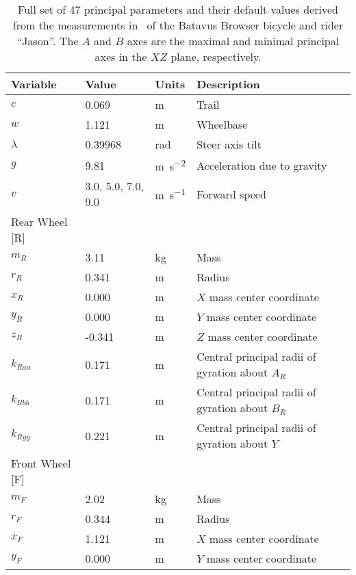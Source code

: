 \documentclass{bmd2019p}
\begin{document}
\begin{table}
  \caption{Full set of 47 principal parameters and their default values derived
    from the measurements in~\cite{Moore2012} of the Batavus Browser bicycle
    and rider ``Jason''. The $A$ and $B$ axes are the maximal and minimal
    principal axes in the $XZ$ plane, respectively.}
  \label{tab:parameters}
  \small
  \centering
  \begin{tabular}{llll}
    \toprule
    Variable & Value & Units & Description \\
    \midrule
    $c$       &  0.069           & \si{\meter} & Trail \\
    $w$       &  1.121             & \si{\meter} & Wheelbase \\
    $\lambda$ & 0.39968             & \si{\radian} & Steer axis tilt \\
    $g$       &  9.81               & \si{\meter\per\second\squared} & Acceleration due to gravity \\
    $v$       &  3.0, 5.0, 7.0, 9.0 & \si{\meter\per\second} & Forward speed \\
    Rear Wheel [R] & & \\
    \midrule
    $m_R$     & 3.11 & \si{\kilogram}  & Mass \\
    $r_R$     & 0.341 & \si{\meter}  & Radius \\
    $x_R$     & 0.000 & \si{\meter}      & $X$ mass center coordinate \\
    $y_R$     & 0.000 & \si{\meter}      & $Y$ mass center coordinate \\
    $z_R$     & -0.341 & \si{\meter} & $Z$ mass center coordinate \\
    $k_{Raa}$ & 0.171 & \si{\meter}  & Central principal radii of gyration about $A_R$ \\
    $k_{Rbb}$ & 0.171 & \si{\meter}  & Central principal radii of gyration about $B_R$ \\
    $k_{Ryy}$ & 0.221 & \si{\meter}  & Central principal radii of gyration about $Y$ \\
    Front Wheel [F] & & \\
    \midrule
    $m_F$     & 2.02 & \si{\kilogram} & Mass \\
    $r_F$     & 0.344 & \si{\meter} & Radius \\
    $x_F$     & 1.121 & \si{\meter} & $X$ mass center coordinate \\
    $y_F$     & 0.000 & \si{\meter} & $Y$ mass center coordinate \\

\end{tabular}
\end{table}
\end{document}
